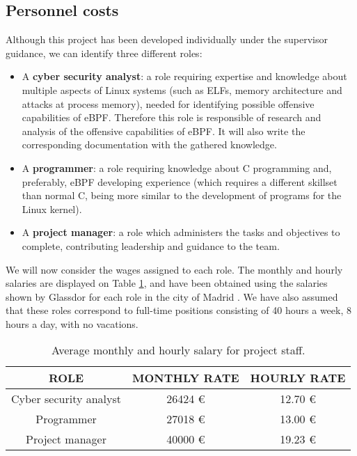 \subsection{Personnel costs}
Although this project has been developed individually under the supervisor guidance, we can identify three different roles:
\begin{itemize}
\item A \textbf{cyber security analyst}: a role requiring expertise and knowledge about multiple aspects of Linux systems (such as ELFs, memory architecture and attacks at process memory), needed for identifying possible offensive capabilities of eBPF. Therefore this role is responsible of research and analysis of the offensive capabilities of eBPF. It will also write the corresponding documentation with the gathered knowledge.
\item A \textbf{programmer}: a role requiring knowledge about C programming and, preferably, eBPF developing experience (which requires a different skillset than normal C, being more similar to the development of programs for the Linux kernel).
\item A \textbf{project manager}: a role which administers the tasks and objectives to complete, contributing leadership and guidance to the team.
\end{itemize}

We will now consider the wages assigned to each role. The monthly and hourly salaries are displayed on Table \ref{table:salary_personnel}, and have been obtained using the salaries shown by Glassdor for each role in the city of Madrid \cite{glass_analyst} \cite{glass_manager} \cite{glass_programmer}. We have also assumed that these roles correspond to full-time positions consisting of 40 hours a week, 8 hours a day, with no vacations.

\begin{table}[htbp]
\begin{tabular}{|c|c|c|}
\hline
\textbf{ROLE} & \textbf{MONTHLY RATE} & \textbf{HOURLY RATE}\\
\hline
\hline
Cyber security analyst & 26424 € & 12.70 € \\
\hline
Programmer & 27018 € & 13.00 € \\
\hline
Project manager & 40000 € & 19.23 € \\ 
\hline
\end{tabular}
\caption{Average monthly and hourly salary for project staff.}
\label{table:salary_personnel}
\end{table}

